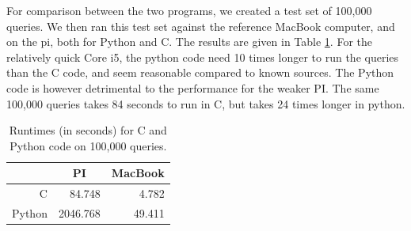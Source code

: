 For comparison between the two programs, we created a test set of 100,000 queries. We then ran this test set against the reference MacBook computer, and on the pi, both for Python and {C}. 
The results are given in Table \ref{tbl:runtimes_ports}. 
For the relatively quick {Core i5}, the python code need 10 times longer to run the queries than the C code, and seem reasonable compared to known sources.
The Python code is however detrimental to the performance for the weaker PI. The same 100,000 queries takes 84 seconds to run in C, but takes 24 times longer in python.

\begin{table}[h]
	\begin{center}
	\begin{tabular}{|r|r|r|}
	\hline
	   & \multicolumn{1}{|c|}{PI}     & \multicolumn{1}{|c|}{MacBook} \\
	\hline
	C      & 84.748   & 4.782     \\
	\hline
	Python & 2046.768 & 49.411    \\
	\hline
	\end{tabular}
	\caption{Runtimes (in seconds) for C and Python code on 100,000 queries.}
	\label{tbl:runtimes_ports}
	\end{center}
\end{table}
